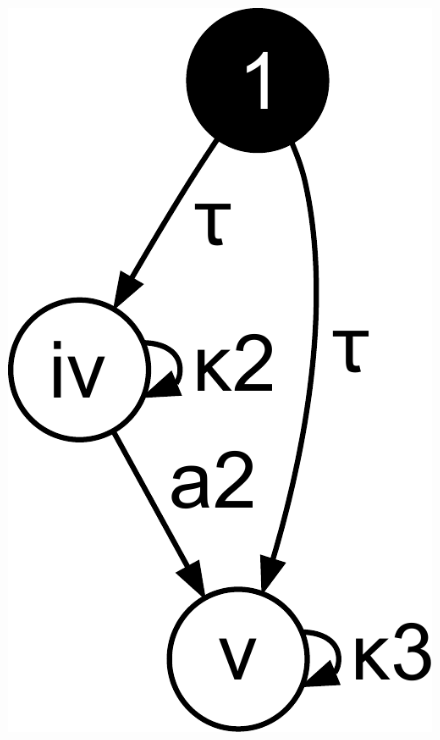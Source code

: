 \begin{figure}[hbt]
\begin{minipage}[b]{4cm}
    \includegraphics[scale=0.2]{prop-pres-case-studies/figs/broadcast-rule2-lhs}
  \end{minipage}
  \hfill
  \begin{minipage}[b]{4cm}
    \centering

\end{minipage}
\end{figure}
